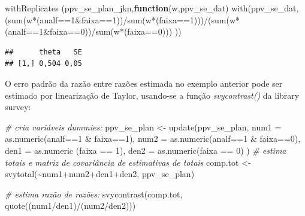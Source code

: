 \documentclass[
  12pt,
  brazilian,
]{book}
\newenvironment{Shaded}{\begin{snugshade}}{\end{snugshade}}
\newcommand{\AttributeTok}[1]{\textcolor[rgb]{0.77,0.63,0.00}{#1}}
\newcommand{\CommentTok}[1]{\textcolor[rgb]{0.56,0.35,0.01}{\textit{#1}}}
\newcommand{\ControlFlowTok}[1]{\textcolor[rgb]{0.13,0.29,0.53}{\textbf{#1}}}
\newcommand{\DecValTok}[1]{\textcolor[rgb]{0.00,0.00,0.81}{#1}}
\newcommand{\FunctionTok}[1]{\textcolor[rgb]{0.00,0.00,0.00}{#1}}
\newcommand{\NormalTok}[1]{#1}
\newcommand{\OtherTok}[1]{\textcolor[rgb]{0.56,0.35,0.01}{#1}}
\newcommand{\SpecialCharTok}[1]{\textcolor[rgb]{0.00,0.00,0.00}{#1}}
\theoremstyle{definition}
\theoremstyle{definition}
\theoremstyle{definition}
\theoremstyle{definition}
\theoremstyle{remark}
\begin{document}
\begin{Shaded}
\begin{Highlighting}[]
\FunctionTok{withReplicates}\NormalTok{ (ppv\_se\_plan\_jkn,}\ControlFlowTok{function}\NormalTok{(w,ppv\_se\_dat) }\FunctionTok{with}\NormalTok{(ppv\_se\_dat,}
\NormalTok{(}\FunctionTok{sum}\NormalTok{(w}\SpecialCharTok{*}\NormalTok{(analf}\SpecialCharTok{==}\DecValTok{1}\SpecialCharTok{\&}\NormalTok{faixa}\SpecialCharTok{==}\DecValTok{1}\NormalTok{))}\SpecialCharTok{/}\FunctionTok{sum}\NormalTok{(w}\SpecialCharTok{*}\NormalTok{(faixa}\SpecialCharTok{==}\DecValTok{1}\NormalTok{)))}\SpecialCharTok{/}\NormalTok{(}\FunctionTok{sum}\NormalTok{(w}\SpecialCharTok{*}\NormalTok{(analf}\SpecialCharTok{==}\DecValTok{1}\SpecialCharTok{\&}\NormalTok{faixa}\SpecialCharTok{==}\DecValTok{0}\NormalTok{))}\SpecialCharTok{/}\FunctionTok{sum}\NormalTok{(w}\SpecialCharTok{*}\NormalTok{(faixa}\SpecialCharTok{==}\DecValTok{0}\NormalTok{)))}
\NormalTok{))  }
\end{Highlighting}
\end{Shaded}

\begin{verbatim}
##      theta   SE
## [1,] 0,504 0,05
\end{verbatim}

O erro padrão da razão entre razões estimada no exemplo anterior pode ser estimado por linearização de Taylor, usando-se a função \emph{svycontrast()} da library survey:

\begin{Shaded}
\begin{Highlighting}[]
\CommentTok{\# cria variáveis dummies: }
\NormalTok{ppv\_se\_plan }\OtherTok{\textless{}{-}} \FunctionTok{update}\NormalTok{(ppv\_se\_plan,}
\AttributeTok{num1 =} \FunctionTok{as.numeric}\NormalTok{(analf}\SpecialCharTok{==}\DecValTok{1} \SpecialCharTok{\&}\NormalTok{ faixa}\SpecialCharTok{==}\DecValTok{1}\NormalTok{),}
\AttributeTok{num2 =} \FunctionTok{as.numeric}\NormalTok{(analf}\SpecialCharTok{==}\DecValTok{1} \SpecialCharTok{\&}\NormalTok{ faixa}\SpecialCharTok{==}\DecValTok{0}\NormalTok{),}
\AttributeTok{den1 =} \FunctionTok{as.numeric}\NormalTok{ (faixa }\SpecialCharTok{==} \DecValTok{1}\NormalTok{),}
\AttributeTok{den2 =} \FunctionTok{as.numeric}\NormalTok{(faixa }\SpecialCharTok{==} \DecValTok{0}\NormalTok{)}
\NormalTok{)}
\CommentTok{\# estima totais e matriz de covariância de estimativas de totais}
\NormalTok{comp.tot }\OtherTok{\textless{}{-}} \FunctionTok{svytotal}\NormalTok{(}\SpecialCharTok{\textasciitilde{}}\NormalTok{num1}\SpecialCharTok{+}\NormalTok{num2}\SpecialCharTok{+}\NormalTok{den1}\SpecialCharTok{+}\NormalTok{den2, ppv\_se\_plan)  }

\CommentTok{\# estima razão de razões:  }
\FunctionTok{svycontrast}\NormalTok{(comp.tot, }\FunctionTok{quote}\NormalTok{((num1}\SpecialCharTok{/}\NormalTok{den1)}\SpecialCharTok{/}\NormalTok{(num2}\SpecialCharTok{/}\NormalTok{den2)))  }
\end{Highlighting}
\end{Shaded}
\end{document}
